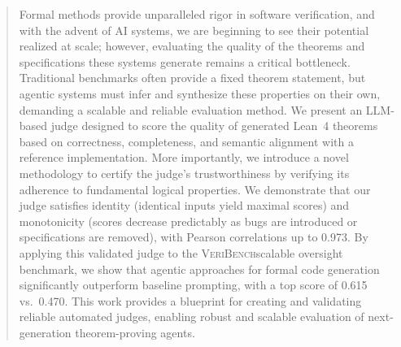 \begin{abstract}
Formal methods provide unparalleled rigor in software verification, and with the advent of AI systems, we are beginning to see their potential realized at scale; however, evaluating the quality of the theorems and specifications these systems generate remains a critical bottleneck.
Traditional benchmarks often provide a fixed theorem statement, but agentic systems must infer and synthesize these properties on their own, demanding a scalable and reliable evaluation method.
We present an LLM-based judge designed to score the quality of generated Lean~4 theorems based on correctness, completeness, and semantic alignment with a reference implementation.
More importantly, we introduce a novel methodology to certify the judge's trustworthiness by verifying its adherence to fundamental logical properties.
We demonstrate that our judge satisfies identity (identical inputs yield maximal scores) and monotonicity (scores decrease predictably as bugs are introduced or specifications are removed), with Pearson correlations up to 0.973.
By applying this validated judge to the \textsc{VeriBench}\citep{veribench_icml25}scalable oversight benchmark, we show that agentic approaches for formal code generation significantly outperform baseline prompting, with a top score of 0.615 vs.\ 0.470.
This work provides a blueprint for creating and validating reliable automated judges, enabling robust and scalable evaluation of next-generation theorem-proving agents.
\end{abstract}